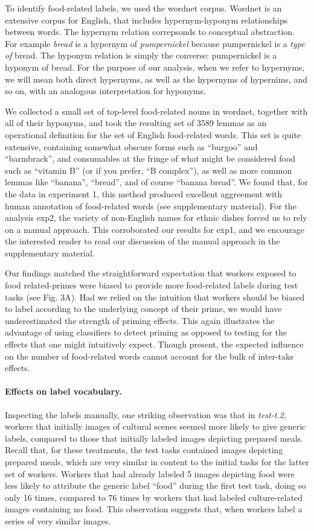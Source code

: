 \documentclass[12pt]{article}
\begin{document}
To identify food-related labels, we used the wordnet corpus.  Wordnet
is an extensive corpus for English, that includes hypernym-hyponym 
relationships between words.  The hypernym relation correpsonds to conceptual
abstraction.  For example \textit{bread} is a hypernym of 
\textit{pumpernickel} because pumpernickel is a \textit{type of} bread.
The hyponym relation is simply the converse: pumpernickel is a hyponym
of bread.  For the purpose of our analysis, when we refer to hypernyms,
we will mean both direct hypernyms, as well as the hypernyms of hypernims,
and so on, with an analogous interpretation for hyponyms.

We collectod a small set of top-level food-related nouns in wordnet,
together with all of their hyponyms, and took the resulting set of 
3589 lemmas as an operational definition for the set of English food-related 
words.  This set is quite extensive, containing somewhat obscure forms such as
``burgoo'' and ``barmbrack'', and consumables at the fringe of what might
be considered food such as ``vitamin B'' (or if you prefer, 
``B complex''), as well as more common lemmas like
``banana'',  ``bread'', and of course ``banana bread''.  We found that,
for the data in experiment 1, this method produced excellent aggreement with 
human annotation of food-related words (see supplementary material).  
For the analysis exp2, the variety of non-English names for ethnic dishes 
forced us to rely on a manual approach.  This corroborated our results
for exp1, and we encourage the interested reader to read our discussion of
the manual approach in the supplementary material.

Our findings matched the straightforward expectation that workers exposed to 
food related-primes were biased to provide more food-related labels during 
test tasks (see Fig. 3A).  Had we relied on the intuition that workers 
should be biased to label according to the underlying concept of their prime,
we would have underestimated the strength of priming effects.  This
again illustrates the advantage of using classifiers to detect priming as
opposed to testing for the effects that one might intuitively expect.  
Though present, the expected influence on the number of food-related words
cannot account for the bulk of inter-taks effects.

\paragraph{Effects on label vocabulary.}
Inspecting the labels manually, one striking observation was that in
\textit{test-t.2}, workers that initially images of cultural scenes seemed
more likely to give generic labels, compared to those that initially labeled 
images depicting prepared meals.  Recall that, for these treatments, the test 
tasks contained images depicting prepared meals, which are very similar in
content to the initial tasks for the latter set of workers.  Workers that
had already labeled 5 images depicting food were less likely to attribute
the generic label ``food'' during the first test task, doing so only 16 times,
compared to 76 times by workers that had labeled culture-related images 
containing no food.  This observation suggests that, when workers label a 
series of very similar images.
\end{document}
